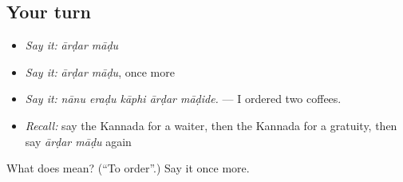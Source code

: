 \subsection*{Your turn}
\begin{itemize}
\raggedright
  \item \emph{Say it:} \emph{ārḍar māḍu}
  \item \emph{Say it:} \emph{ārḍar māḍu}, once more
  \item \emph{Say it:} \emph{nānu eraḍu kāphi ārḍar māḍide.} — I ordered two coffees.
  \item \emph{Recall:} say the Kannada for a waiter, then the Kannada for a gratuity, then say \emph{ārḍar māḍu} again
\end{itemize}

\begin{tcolorbox}[breakable,colback=teal!4,colframe=teal!35!black,title={Before you move on}]
What does   mean? (\textquotedblleft{}To order\textquotedblright{}.) Say it once more.
\end{tcolorbox}

